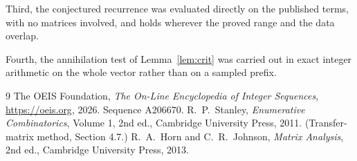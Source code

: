\documentclass[11pt,a4paper]{article}
\theoremstyle{plain}
\theoremstyle{definition}
\begin{document}
Third, the conjectured recurrence was evaluated directly on the published terms, with no
matrices involved, and holds wherever the proved range and the data overlap.

Fourth, the annihilation test of Lemma~\ref{lem:crit} was carried out in exact integer
arithmetic on the whole vector rather than on a sampled prefix.

\begin{thebibliography}{9}
 The OEIS Foundation, \emph{The On-Line Encyclopedia of Integer
Sequences}, \url{https://oeis.org}, 2026. Sequence A206670.
 R.~P.~Stanley, \emph{Enumerative Combinatorics}, Volume 1, 2nd ed.,
Cambridge University Press, 2011. (Transfer-matrix method, Section 4.7.)
 R.~A.~Horn and C.~R.~Johnson, \emph{Matrix Analysis}, 2nd ed., Cambridge
University Press, 2013.
\end{thebibliography}
\end{document}
